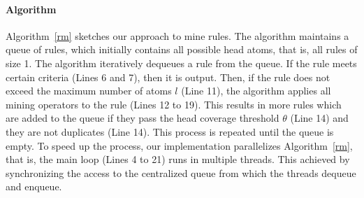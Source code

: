 \paragraph{Algorithm} \label{algo}
Algorithm~\ref{rm} sketches our approach to mine rules. The algorithm maintains a queue of rules, 
which initially contains all possible head atoms, that is,
all rules of size 1.
The algorithm iteratively dequeues a rule from the queue. If the rule 
meets certain criteria (Lines 6 and 7), then it is output.
Then, if the rule does not exceed the maximum number of atoms $l$ (Line 11), 
the algorithm applies all mining operators to the rule (Lines 12 to 19). This results in more rules which are added to 
the queue if they pass the head coverage threshold $\theta$ (Line 14) and they are not duplicates (Line 14).
This process is repeated until the queue is empty. 
To speed up the process, our implementation parallelizes Algorithm~\ref{rm}, that is, the main loop (Lines 4 to 21) runs
in multiple threads. 
This achieved by synchronizing the access to the centralized queue from which the threads dequeue and enqueue.



